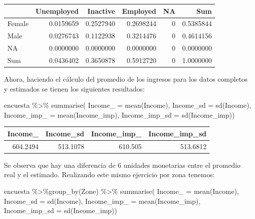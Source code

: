 \documentclass[
  12pt,
]{book}
\newenvironment{Shaded}{\begin{snugshade}}{\end{snugshade}}
\newcommand{\AttributeTok}[1]{\textcolor[rgb]{0.77,0.63,0.00}{#1}}
\newcommand{\FunctionTok}[1]{\textcolor[rgb]{0.00,0.00,0.00}{#1}}
\newcommand{\NormalTok}[1]{#1}
\newcommand{\SpecialCharTok}[1]{\textcolor[rgb]{0.00,0.00,0.00}{#1}}
\begin{document}
\begin{tabular}{l|r|r|r|r|r}
\hline
  & Unemployed & Inactive & Employed & NA & Sum\\
\hline
Female & 0.0159659 & 0.2527940 & 0.2698244 & 0 & 0.5385844\\
\hline
Male & 0.0276743 & 0.1122938 & 0.3214476 & 0 & 0.4614156\\
\hline
NA & 0.0000000 & 0.0000000 & 0.0000000 & 0 & 0.0000000\\
\hline
Sum & 0.0436402 & 0.3650878 & 0.5912720 & 0 & 1.0000000\\
\hline
\end{tabular}

Ahora, haciendo el cálculo del promedio de los ingresos para los datos completos y estimados se tienen los siguientes resultados:

\begin{Shaded}
\begin{Highlighting}[]
\NormalTok{encuesta }\SpecialCharTok{\%\textgreater{}\%} \FunctionTok{summarise}\NormalTok{(}
  \AttributeTok{Income\_ =} \FunctionTok{mean}\NormalTok{(Income),}
  \AttributeTok{Income\_sd =} \FunctionTok{sd}\NormalTok{(Income),}
  \AttributeTok{Income\_imp\_ =} \FunctionTok{mean}\NormalTok{(Income\_imp),}
  \AttributeTok{Income\_imp\_sd =} \FunctionTok{sd}\NormalTok{(Income\_imp))}
\end{Highlighting}
\end{Shaded}

\begin{tabular}{r|r|r|r}
\hline
Income\_ & Income\_sd & Income\_imp\_ & Income\_imp\_sd\\
\hline
604.2494 & 513.1078 & 610.505 & 513.6812\\
\hline
\end{tabular}

Se observa que hay una diferencia de 6 unidades monetarias entre el promedio real y el estimado. Realizando este mismo ejercicio por zona tenemos:

\begin{Shaded}
\begin{Highlighting}[]
\NormalTok{encuesta }\SpecialCharTok{\%\textgreater{}\%}\FunctionTok{group\_by}\NormalTok{(Zone) }\SpecialCharTok{\%\textgreater{}\%}  \FunctionTok{summarise}\NormalTok{(}
  \AttributeTok{Income\_ =} \FunctionTok{mean}\NormalTok{(Income),}
  \AttributeTok{Income\_sd =} \FunctionTok{sd}\NormalTok{(Income),}
  \AttributeTok{Income\_imp\_ =} \FunctionTok{mean}\NormalTok{(Income\_imp),}
  \AttributeTok{Income\_imp\_sd =} \FunctionTok{sd}\NormalTok{(Income\_imp))}
\end{Highlighting}
\end{Shaded}
\end{document}
